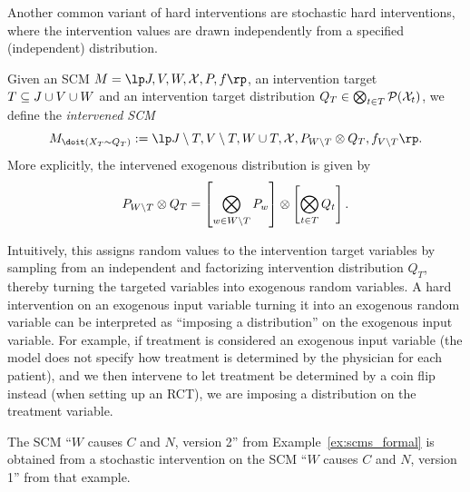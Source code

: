 Another common variant of hard interventions are stochastic hard interventions, where the intervention
values are drawn independently from a specified (independent) distribution.
\begin{Def}\label{def:scm_hard_intervention_stochastic}
  Given an SCM $M = \lt \Sin, \Send, \Srnd, \CX, P, f \rt$, an intervention target $T \subseteq J \cup V \cup W$ 
  and an intervention target distribution $Q_T \in \bigotimes_{t\in T} \mathcal{P}(\mathcal{X}_t)$, we define the \emph{intervened SCM}
  $$M_{\doit(\XT\sim Q_T)} := \lt \Sin\setminus T,\Send\setminus T,\Srnd \cup T,\CX,P_{\Srnd\setminus T} \otimes Q_T,f_{\Send\setminus T} \rt.$$
  More explicitly, the intervened exogenous distribution is given by
  $$P_{W\setminus T} \otimes Q_T = \left[\bigotimes_{w \in W\setminus T} P_w\right] \otimes \left[\bigotimes_{t \in T} Q_t\right].$$
\end{Def}
Intuitively, this assigns random values to the intervention target variables
by sampling from an independent and factorizing intervention distribution $Q_T$, thereby
turning the targeted variables into exogenous random variables.
A hard intervention on an exogenous input variable turning it into an exogenous random variable
can be interpreted as ``imposing a distribution'' on the exogenous input variable.
For example, if treatment is considered an exogenous input variable (the model does not specify 
how treatment is determined by the physician for each patient), and we then intervene to let 
treatment be determined by a coin flip instead (when setting up an RCT),
we are imposing a distribution on the treatment variable.
\begin{Eg}
  The SCM ``$W$ causes $C$ and $N$, version 2'' from Example~\ref{ex:scms_formal} is obtained from 
  a stochastic intervention on the SCM ``$W$ causes $C$ and $N$, version 1'' from that example.
\end{Eg}


